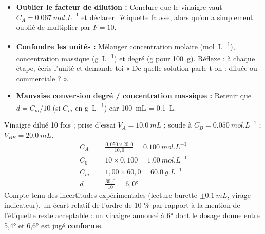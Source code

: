 \documentclass[11pt]{article}
\begin{document}
\begin{attention}
\begin{itemize}
\item \textbf{Oublier le facteur de dilution :} Conclure que le vinaigre vaut $C_A = \SI{0,067}{mol.L^{-1}}$ et déclarer l'étiquette fausse, alors qu'on a simplement oublié de multiplier par $F = 10$.
\item \textbf{Confondre les unités :} Mélanger concentration molaire (\si{mol.L^{-1}}), concentration massique (\si{g.L^{-1}}) et degré (g pour \SI{100}{g}). Réflexe : à chaque étape, écris l'unité et demande-toi « De quelle solution parle-t-on : diluée ou commerciale ? ».
\item \textbf{Mauvaise conversion degré / concentration massique :} Retenir que $d = C_m / 10$ (si $C_m$ en \si{g.L^{-1}}) car \SI{100}{mL} = \SI{0,1}{L}.
\end{itemize}
\end{attention}

\begin{exemplebox}
Vinaigre dilué 10 fois ; prise d'essai $V_A = \SI{10,0}{mL}$ ; soude à $C_B = \SI{0,050}{mol.L^{-1}}$ ; $V_{BE} = \SI{20,0}{mL}$.
\begin{align*}
C_A &= \frac{0,050 \times 20,0}{10,0} = \SI{0,100}{mol.L^{-1}} \\
C_0 &= 10 \times 0,100 = \SI{1,00}{mol.L^{-1}} \\
C_m &= 1,00 \times 60,0 = \SI{60,0}{g.L^{-1}} \\
d &= \frac{60,0}{10} = 6,0°
\end{align*}
Compte tenu des incertitudes expérimentales (lecture burette $\pm \SI{0,1}{mL}$, virage indicateur), un écart relatif de l'ordre de 10 \% par rapport à la mention de l'étiquette reste acceptable : un vinaigre annoncé à 6° dont le dosage donne entre 5,4° et 6,6° est jugé \textbf{conforme}.
\end{exemplebox}
\end{document}
